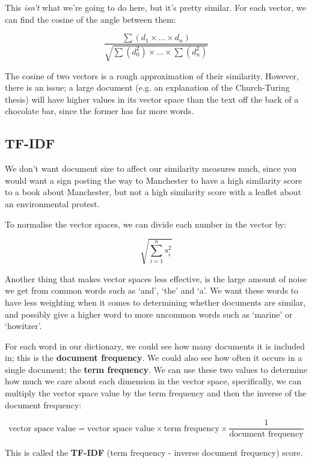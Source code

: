 This \textit{isn't} what we're going to do here, but it's pretty similar. For
each vector, we can find the cosine of the angle between them:


\[
  \frac{\sum (d_1 \times \dots \times d_n)}
       {\sqrt{\sum (d_0^2) \times \dots \times \sum (d_n^2)}}
\]

The cosine of two vectors is a rough approximation of their similarity. However,
there is an issue; a large document (e.g. an explanation of the Church-Turing
thesis) will have higher values in its vector space than the text off the back
of a chocolate bar, since the former has far more words.

\subsection{TF-IDF}

We don't want document size to affect our similarity measures much, since you
would want a sign posting the way to Manchester to have a high similarity score
to a book about Manchester, but not a high similarity score with a leaflet about
an environmental protest. 

To normalise the vector spaces, we can divide each number in the vector by:

\[
  \sqrt{\sum_{i=1}^ns_i^2}
\]

Another thing that makes vector spaces less effective, is the large amount of
noise we get from common words such as `and', `the' and `a'. We want these words
to have less weighting when it comes to determining whether documents are
similar, and possibly give a higher word to more uncommon words such as `marine'
or `howitzer'.

For each word in our dictionary, we could see how many documents it is included
in; this is the \textbf{document frequency}. We could also see how often it
occurs in a single document; the \textbf{term frequency}. We can use these two
values to determine how much we care about each dimension in the vector space,
specifically, we can multiply the vector space value by the term frequency and
then the inverse of the document frequency:

\[
  \text{vector space value} =
    \text{vector space value} \times
    \text{term frequency} \times
    \frac{1}{\text{document frequency}}
\]

This is called the \textbf{TF-IDF} (term frequency - inverse document frequency)
score.

